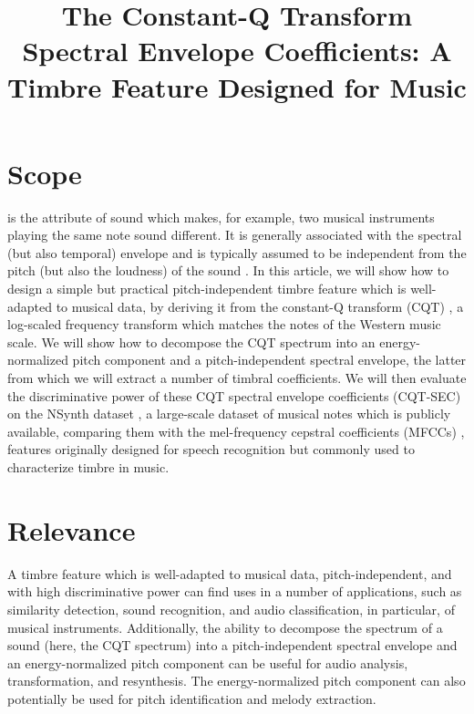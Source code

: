 \documentclass[journal]{IEEEtran}
\begin{document}
\title{The Constant-Q Transform Spectral Envelope Coefficients: A Timbre Feature Designed for Music}

\maketitle

\section{Scope}

 is the attribute of sound which makes, for example, two musical instruments playing the same note sound different. It is generally associated with the spectral (but also temporal) envelope and is typically assumed to be independent from the pitch (but also the loudness) of the sound \cite{moore2004}. In this article, we will show how to design a simple but practical pitch-independent timbre feature which is well-adapted to musical data, by deriving it from the constant-Q transform (CQT) \cite{brown1991, brown1992}, a log-scaled frequency transform which matches the notes of the Western music scale. We will show how to decompose the CQT spectrum into an energy-normalized pitch component and a pitch-independent spectral envelope, the latter from which we will extract a number of timbral coefficients. We will then evaluate the discriminative power of these CQT spectral envelope coefficients (CQT-SEC) on the NSynth dataset \cite{engel2017}, a large-scale dataset of musical notes which is publicly available, comparing them with the mel-frequency cepstral coefficients (MFCCs) \cite{davis1980}, features originally designed for speech recognition but commonly used to characterize timbre in music. 


\section{Relevance}

A timbre feature which is well-adapted to musical data, pitch-independent, and with high discriminative power can find uses in a number of applications, such as similarity detection, sound recognition, and audio classification, in particular, of musical instruments. Additionally, the ability to decompose the spectrum of a sound (here, the CQT spectrum) into a pitch-independent spectral envelope and an energy-normalized pitch component can be useful for audio analysis, transformation, and resynthesis. The energy-normalized pitch component can also potentially be used for pitch identification and melody extraction. 
\end{document}
